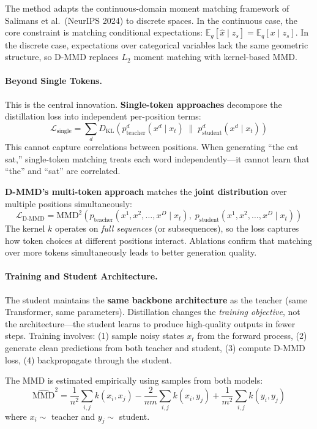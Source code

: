 \documentclass[11pt]{article}
\begin{document}
The method adapts the continuous-domain moment matching framework of Salimans et al.\ (NeurIPS 2024) to discrete spaces.
In the continuous case, the core constraint is matching conditional expectations: $\mathbb{E}_g[\hat{x} \mid z_s] = \mathbb{E}_q[x \mid z_s]$.
In the discrete case, expectations over categorical variables lack the same geometric structure, so D-MMD replaces $L_2$ moment matching with kernel-based MMD.

\paragraph{Beyond Single Tokens.}
This is the central innovation.
\textbf{Single-token approaches} decompose the distillation loss into independent per-position terms:
\[
\mathcal{L}_{\mathrm{single}} = \sum_d D_{\mathrm{KL}}\!\left(p_{\mathrm{teacher}}^d(x^d \mid x_t) \;\|\; p_{\mathrm{student}}^d(x^d \mid x_t)\right)
\]
This cannot capture correlations between positions.
When generating ``the cat sat,'' single-token matching treats each word independently---it cannot learn that ``the'' and ``sat'' are correlated.

\textbf{D-MMD's multi-token approach} matches the \textbf{joint distribution} over multiple positions simultaneously:
\[
\mathcal{L}_{\mathrm{D\text{-}MMD}} = \mathrm{MMD}^2\!\left(p_{\mathrm{teacher}}(x^1, x^2, \ldots, x^D \mid x_t),\; p_{\mathrm{student}}(x^1, x^2, \ldots, x^D \mid x_t)\right)
\]
The kernel $k$ operates on \emph{full sequences} (or subsequences), so the loss captures how token choices at different positions interact.
Ablations confirm that matching over more tokens simultaneously leads to better generation quality.

\paragraph{Training and Student Architecture.}
The student maintains the \textbf{same backbone architecture} as the teacher (same Transformer, same parameters).
Distillation changes the \emph{training objective}, not the architecture---the student learns to produce high-quality outputs in fewer steps.
Training involves: (1) sample noisy states $x_t$ from the forward process, (2) generate clean predictions from both teacher and student, (3) compute D-MMD loss, (4) backpropagate through the student.

The MMD is estimated empirically using samples from both models:
\[
\widehat{\mathrm{MMD}}^2 = \frac{1}{n^2}\sum_{i,j} k(x_i, x_j) - \frac{2}{nm}\sum_{i,j} k(x_i, y_j) + \frac{1}{m^2}\sum_{i,j} k(y_i, y_j)
\]
where $x_i \sim$ teacher and $y_j \sim$ student.
\end{document}
